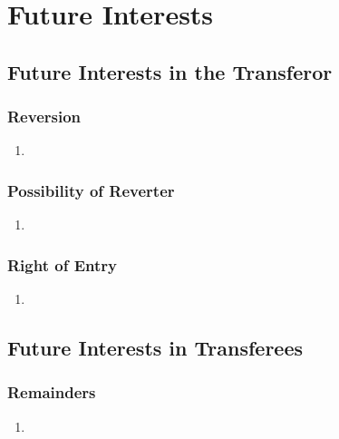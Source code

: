 \section{Future Interests}

\subsection{Future Interests in the Transferor}

\subsubsection{Reversion}

\begin{enumerate}
    \item %
\end{enumerate}

\subsubsection{Possibility of Reverter}

\begin{enumerate}
    \item %
\end{enumerate}

\subsubsection{Right of Entry}

\begin{enumerate}
    \item %
\end{enumerate}

\subsection{Future Interests in Transferees}

\subsubsection{Remainders}

\begin{enumerate}
    \item %
\end{enumerate}

